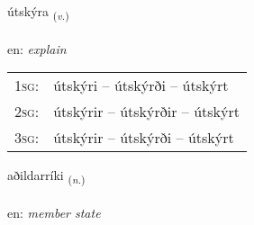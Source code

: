 \documentclass[frontgrid, backgrid]{flacards}\usepackage[]{graphicx}\usepackage[]{color}
\begin{document}
\renewcommand{\flhead}{\vskip5pt \fboxsep=0pt {\small\bfseries\footnotesize Sagnorð | Verb}}
\renewcommand{\fcfoot}{\vskip5pt \fboxsep=0pt \hspace{2pt}{\small\bfseries\footnotesize 2K}}

\renewcommand{\blhead}{\vskip5pt {\small\bfseries\footnotesize Sagnorð | Verb }}
\renewcommand{\bcfoot}{\vskip5pt \hspace{2pt}{\small\bfseries\footnotesize 2K}}


{útskýra \small{\textsubscript{(\textit{v.})}} \\[1ex] %
\textphonetic{[uːtscira]} \\
en: \emph{explain} \\  [2ex]
\renewcommand*{\arraystretch}{0.8}
\begin{tabular}{p{1cm}l}
\textsc{1sg}: & útskýri -- útskýrði -- útskýrt \\ 
\textsc{2sg}: & útskýrir -- útskýrðir -- útskýrt \\ 
\textsc{3sg}: & útskýrir -- útskýrði -- útskýrt \\ 
\end{tabular}
}

\renewcommand{\flhead}{\vskip5pt \fboxsep=0pt {\small\bfseries\footnotesize Nafnorð | Noun}}
\renewcommand{\fcfoot}{\vskip5pt \fboxsep=0pt \hspace{2pt}{\small\bfseries\footnotesize 2K}}

\renewcommand{\blhead}{\vskip5pt {\small\bfseries\footnotesize Nafnorð | Noun }}
\renewcommand{\bcfoot}{\vskip5pt \hspace{2pt}{\small\bfseries\footnotesize 2K}}


{aðildarríki \small{\textsubscript{(\textit{n.})}} \\[1ex] %
\textphonetic{[aːðɪltaricɪ]} \\
en: \emph{member state} \\  [2ex]
\renewcommand*{\arraystretch}{0.8}
}
\end{document}
